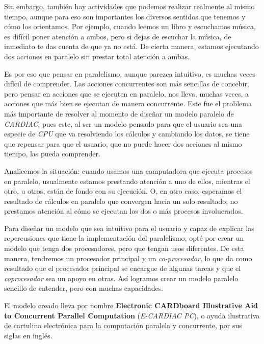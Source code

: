 \documentclass[letterpaper,12pt,oneside]{book}
\begin{document}
	 Sin embargo, 
	 también
	 hay actividades que podemos realizar realmente al mismo tiempo, aunque para eso son importantes los diversos sentidos que tenemos y cómo los 
	 orientamos. Por
	 ejemplo, cuando leemos un libro y escuchamos música, es difícil poner atención a ambos, pero si dejas de escuchar 
	 la música,
	 de inmediato te das cuenta de que ya no está. De cierta manera, estamos ejecutando dos acciones en paralelo sin prestar total atención a ambas.
	 
	 Es por eso que pensar en paralelismo, aunque parezca intuitivo, es muchas veces difícil de comprender. Las acciones concurrentes son
	 más sencillas de concebir,
	 pero pensar en acciones que se ejecuten en paralelo, nos lleva, muchas veces, a acciones que más bien se ejecutan 
	 de manera concurrente. Este fue el problema
	 más importante de resolver al momento de diseñar un modelo paralelo de \textit{CARDIAC},
	  pues este, al ser un modelo pensado para que el usuario sea
	 una especie de \textit{CPU} que va resolviendo los cálculos y cambiando los datos, se tiene que repensar para que el usuario, que no puede hacer dos 
	 acciones al
	 mismo tiempo, las pueda comprender.
	 
	 Analicemos la situación: cuando usamos una computadora que ejecuta procesos en paralelo, 
	 usualmente estamos prestando
	 atención a uno de ellos, mientras el otro, u otros, están de fondo con su ejecución. O, en otro caso, 
	 esperamos el resultado
	 de cálculos en paralelo que convergen hacia un solo resultado; no prestamos atención al cómo se ejecutan los dos o más procesos involucrados.
	 
	 Para diseñar un modelo que sea intuitivo para el usuario y capaz de explicar las repercusiones que tiene
	 la implementación del paralelismo, opté por crear un modelo que tenga dos procesadores, pero que tengan
	 usos diferentes. De esta manera, tendremos un procesador principal y un \textit{co-procesador}, lo
	 que da como resultado que el procesador principal
	 se encargue de algunas tareas y que el \textit{coprocesador} sea un apoyo en otras. Así logramos crear un modelo
	 paralelo sencillo de entender, pero con muchas capacidades.
	 


	 El modelo creado lleva por nombre \textbf{Electronic CARDboard Illustrative Aid to
	 Concurrent Parallel Computation} (\textit{E-CARDIAC PC}), o ayuda ilustrativa de cartulina electrónica para la computación paralela y concurrente, 
	 por
	 sus siglas en inglés.
	 
\end{document}
